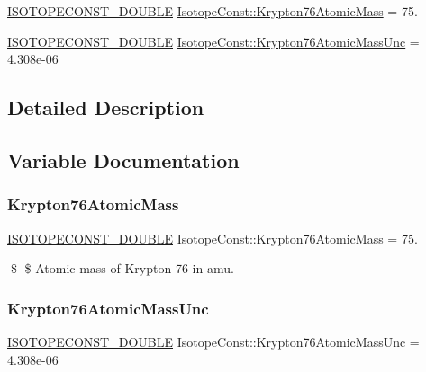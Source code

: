 \begin{DoxyCompactItemize}
\item 
\mbox{\hyperlink{group___isotope_const-_macros_ga8f45a7272ce02c0b4c65c44636ed719a}{I\+S\+O\+T\+O\+P\+E\+C\+O\+N\+S\+T\+\_\+\+D\+O\+U\+B\+LE}} \mbox{\hyperlink{group___isotope_const-_krypton-_kr76_ga278c5ecdb405a1699ba44dcb9c34998a}{Isotope\+Const\+::\+Krypton76\+Atomic\+Mass}} = 75.
\item 
\mbox{\hyperlink{group___isotope_const-_macros_ga8f45a7272ce02c0b4c65c44636ed719a}{I\+S\+O\+T\+O\+P\+E\+C\+O\+N\+S\+T\+\_\+\+D\+O\+U\+B\+LE}} \mbox{\hyperlink{group___isotope_const-_krypton-_kr76_ga605e03c5b8f32615bf37893d181e00e6}{Isotope\+Const\+::\+Krypton76\+Atomic\+Mass\+Unc}} = 4.\+308e-\/06
\end{DoxyCompactItemize}


\subsection{Detailed Description}


\subsection{Variable Documentation}
\mbox{\label{group___isotope_const-_krypton-_kr76_ga278c5ecdb405a1699ba44dcb9c34998a}} 
\subsubsection{\texorpdfstring{Krypton76\+Atomic\+Mass}{Krypton76AtomicMass}}
{\footnotesize\ttfamily \mbox{\hyperlink{group___isotope_const-_macros_ga8f45a7272ce02c0b4c65c44636ed719a}{I\+S\+O\+T\+O\+P\+E\+C\+O\+N\+S\+T\+\_\+\+D\+O\+U\+B\+LE}} Isotope\+Const\+::\+Krypton76\+Atomic\+Mass = 75.}

\$ \$ Atomic mass of Krypton-\/76 in amu. \mbox{\label{group___isotope_const-_krypton-_kr76_ga605e03c5b8f32615bf37893d181e00e6}} 
\subsubsection{\texorpdfstring{Krypton76\+Atomic\+Mass\+Unc}{Krypton76AtomicMassUnc}}
{\footnotesize\ttfamily \mbox{\hyperlink{group___isotope_const-_macros_ga8f45a7272ce02c0b4c65c44636ed719a}{I\+S\+O\+T\+O\+P\+E\+C\+O\+N\+S\+T\+\_\+\+D\+O\+U\+B\+LE}} Isotope\+Const\+::\+Krypton76\+Atomic\+Mass\+Unc = 4.\+308e-\/06}

